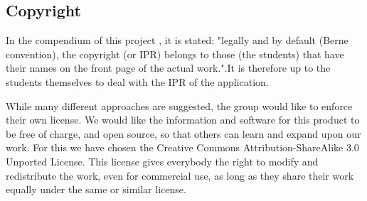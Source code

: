 \subsection{Copyright}

In the compendium of this project \cite[Section~3.9]{compendium}, it is stated:
"legally and by default (Berne convention), the copyright (or IPR) belongs to
those (the students) that have their names on the front page of the actual
work.".\newline It is therefore up to the students themselves to deal with the
IPR of the application.

While many different approaches are suggested, the group would like to enforce
their own license. We would like the information and software for this product
to be free of charge, and open source, so that others can learn and expand upon
our work. For this we have chosen the Creative Commons Attribution-ShareAlike
3.0 Unported License\cite{creativecommons:licenses}. This license gives everybody the
right to modify and redistribute the work, even for commercial use, as long as
they share their work equally under the same or similar license. 

